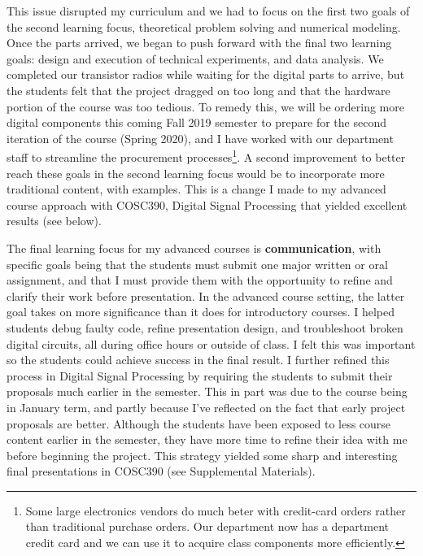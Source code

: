 \documentclass[../../../main.tex]{subfiles}
\begin{document}
This issue disrupted my curriculum and we had to focus on the first two goals of the second learning focus, theoretical problem solving and numerical modeling.  Once the parts arrived, we began to push forward with the final two learning goals: design and execution of technical experiments, and data analysis.  We completed our transistor radios while waiting for the digital parts to arrive, but the students felt that the project dragged on too long and that the hardware portion of the course was too tedious.  To remedy this, we will be ordering more digital components this coming Fall 2019 semester to prepare for the second iteration of the course (Spring 2020), and I have worked with our department staff to streamline the procurement processes\footnote{Some large electronics vendors do much beter with credit-card orders rather than traditional purchase orders.  Our department now has a department credit card and we can use it to acquire class components more efficiently.}.  A second improvement to better reach these goals in the second learning focus would be to incorporate more traditional content, with examples.  This is a change I made to my advanced course approach with COSC390, Digital Signal Processing that yielded excellent results (see below).\\ \hspace{0.1cm}

The final learning focus for my advanced courses is \textbf{communication}, with specific goals being that the students must submit one major written or oral assignment, and that I must provide them with the opportunity to refine and clarify their work before presentation.  In the advanced course setting, the latter goal takes on more significance than it does for introductory courses.  I helped students debug faulty code, refine presentation design, and troubleshoot broken digital circuits, all during office hours or outside of class.  I felt this was important so the students could achieve success in the final result.  I further refined this process in Digital Signal Processing by requiring the students to submit their proposals much earlier in the semester.  This in part was due to the course being in January term, and partly because I've reflected on the fact that early project proposals are better.  Although the students have been exposed to less course content earlier in the semester, they have more time to refine their idea with me before beginning the project.  This strategy yielded some sharp and interesting final presentations in COSC390 (see Supplemental Materials).  \\ \hspace{0.1cm}
\end{document}
